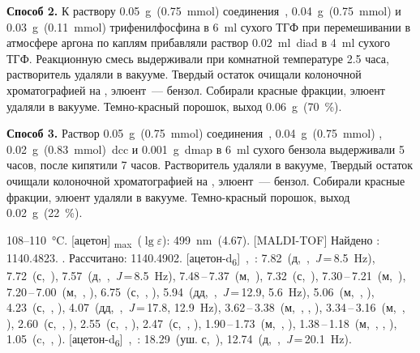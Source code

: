 \textbf{Способ 2.}
К раствору \SI{0.05}{\gram}~(\SI{0.75}{\milli\mole}) соединения~, \SI{0.04}{\gram}~(\SI{0.75}{\milli\mole})  и \SI{0.03}{\gram}~(\SI{0.11}{\milli\mole}) трифенилфосфина в \SI{6}{\milli\litre} сухого ТГФ при перемешивании в атмосфере аргона по каплям прибавляли раствор \SI{0.02}{\milli\litre}~\ac{diad} в \SI{4}{\milli\litre} сухого ТГФ. Реакционную смесь выдерживали при комнатной температуре 2.5 часа, растворитель удаляли в вакууме. Твердый остаток очищали колоночной хроматографией на , элюент~--- бензол. Собирали красные фракции, элюент удаляли в вакууме. Темно-красный порошок, выход \SI{0.06}{\gram}~(\SI{70}{\percent}).

\textbf{Способ 3.}
Раствор \SI{0.05}{\gram}~(\SI{0.75}{\milli\mole}) соединения~, \SI{0.04}{\gram}~(\SI{0.75}{\milli\mole}) , \SI{0.02}{\gram}~(\SI{0.83}{\milli\mole})~\ac{dcc} и \SI{0.001}{\gram}~\ac{dmap} в \SI{6}{\milli\litre} сухого бензола выдерживали 5 часов, после кипятили 7 часов. Растворитель удаляли в вакууме, Твердый остаток очищали колоночной хроматографией на , элюент~--- бензол. Собирали красные фракции, элюент удаляли в вакууме. Темно-красный порошок, выход \SI{0.02}{\gram}~(\SI{22}{\percent}).
\begin{experimental}
     108--\SI{110}{\celsius}.
    [ацетон] \chemlambda\textsubscript{max}~($\lg \varepsilon$): \SI{499}{\nano\metre}~(4.67).
    [MALDI-TOF] Найдено \ce{[M + H]+}: \num{1140.4823}. . Рассчитано: \ce{[M + H]} \num{1140.4902}.
    [ацетон-d\textsubscript{6}]~\chemdelta,~\si{\ppm}: 7.82~(д,~,~\textit{J}\,=\,8.5~\si{\hertz}), 7.72~(с,~), 7.57~(д,~,~\textit{J}\,=\,8.5~\si{\hertz}), 7.48\,--\,7.37~(м,~), 7.32~(с,~), 7.30\,--\,7.21~(м,~), 7.20\,--\,7.00~(м,~, ), 6.75~(с,~, ), 5.94~(дд,~,~\textit{J}\,=\,12.9, 5.6~\si{\hertz}), 5.06~(м,~, ), 4.23~(с,~, ), 4.07~(дд,~,~\textit{J}\,=\,17.8, 12.9~\si{\hertz}), 3.62\,--\,3.38~(м,~, , ), 3.34\,--\,3.16~(м,~, ), 2.60~(с,~, ), 2.55~(с,~, ), 2.47~(с,~, ), 1.90\,--\,1.73~(м,~, ), 1.38\,--\,1.18~(м,~, , ), 1.05~(c,~, ).
    [ацетон-d\textsubscript{6}]~\chemdelta,~\si{\ppm}: 18.29~(уш. с,~), 12.74~(д,~,~\textit{J}\,=\,20.1~\si{\hertz}).
\end{experimental}

